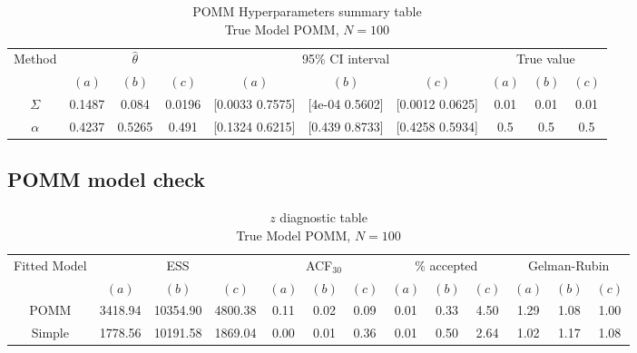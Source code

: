 \documentclass[11pt]{amsart}
\begin{document}
\begin{table}[htbp]
\centering
\caption{
{\large POMM Hyperparameters summary table} \\ 
{\small True Model POMM, $N=100$}
} 
\begin{tabular}{cccccccccc}
\toprule
\multirow{2}{*}{Method} & \multicolumn{3}{c}{
$\hat{\theta}$} & \multicolumn{3}{c}{
95$\%$ CI interval} & \multicolumn{3}{c}{True value} \\
\cmidrule(lr){2-4} \cmidrule(lr){5-7} \cmidrule(lr){8-10}
& $(a)$ & $(b)$ & $(c)$ & $(a)$ & $(b)$ & $(c)$ & $(a)$ & $(b)$ & $(c)$ \\
\midrule
$\Sigma$ &0.1487 & 0.084 & 0.0196 & [0.0033	0.7575] & [4e-04	0.5602] & [0.0012	0.0625] & 0.01 & 0.01 & 0.01   \\
$\alpha$ & 0.4237 & 0.5265 & 0.491 & [0.1324	0.6215] & [0.439	0.8733] & [0.4258	0.5934] & 0.5 & 0.5 & 0.5 \\
\bottomrule
\end{tabular}
\label{table:hyper_summary_POMM}
\end{table}


\subsection{POMM model check}



\begin{table}[htbp]
\centering
\caption*{
{\large $z$ diagnostic table} \\ 
{\small True Model POMM, $N=100$}
} 
\begin{tabular}{ccccccccccccc}
\toprule
\multirow{2}{*}{Fitted Model} & \multicolumn{3}{c}{ESS} & \multicolumn{3}{c}{
ACF$_{30}$} & \multicolumn{3}{c}{$\%$ accepted} & \multicolumn{3}{c}{Gelman-Rubin}\\
\cmidrule(lr){2-4} \cmidrule(lr){5-7} \cmidrule(lr){8-10} \cmidrule(lr){11-13} 
& $(a)$ & $(b)$ & $(c)$ & $(a)$ & $(b)$ & $(c)$ & $(a)$ & $(b)$ & $(c)$ & $(a)$ & $(b)$ & $(c)$ \\
\midrule
POMM &3418.94 & 10354.90 & 4800.38 & 0.11 & 0.02 & 0.09 & 0.01 & 0.33 & 4.50 &  1.29 & 1.08 & 1.00    \\
Simple &1778.56 & 10191.58 & 1869.04 & 0.00 & 0.01 & 0.36 & 0.01 & 0.50 & 2.64 & 1.02 & 1.17 & 1.08 \\
\bottomrule
\end{tabular}
\label{table:z_diagnostic_POMM}
\end{table}
\end{document}
